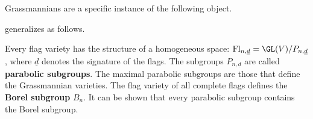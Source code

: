    Grassmannians are a specific instance of the following object.

     generalizes as follows.
    \begin{property}
        Every flag variety has the structure of a homogeneous space: $\mathrm{Fl}_{n,\underline{d}}=\GL(V)/P_{n,\underline{d}}$, where $\underline{d}$ denotes the signature of the flags. The subgroups $P_{n,\underline{d}}$ are called \textbf{parabolic subgroups}. The maximal parabolic subgroups are those that define the Grassmannian varieties. The flag variety of all complete flags defines the \textbf{Borel subgroup} $B_n$. It can be shown that every parabolic subgroup contains the Borel subgroup.
    \end{property}